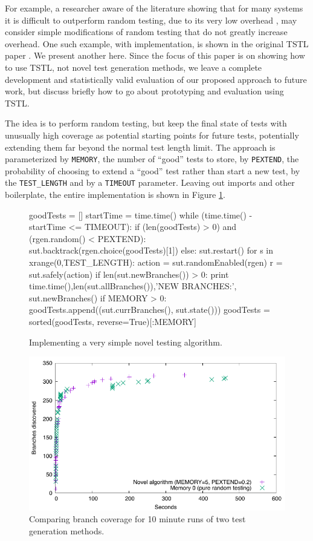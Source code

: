 For example, a researcher aware of the literature showing that for many systems it is difficult to outperform random testing, due to its very low overhead \cite{ISSRE12,ISSTA12}, may consider simple modifications of random testing that do not greatly increase overhead.  One such example, with implementation, is shown in the original TSTL paper \cite{NFM15}.  We present another here.  Since the focus of this paper is on showing how to use TSTL, not novel test generation methods, we leave a complete development and statistically valid evaluation of our proposed approach to future work, but discuss briefly how to go about prototyping and evaluation using TSTL.

The idea is to perform random testing, but keep the final state of tests with unusually high coverage as potential starting points for future tests, potentially extending them far beyond the normal test length limit.  The approach is parameterized by {\tt MEMORY}, the number of ``good'' tests to store, by {\tt PEXTEND}, the probability of choosing to extend a ``good'' test rather than start a new test, by the {\tt TEST\_LENGTH} and by a {\tt TIMEOUT} parameter.  Leaving out imports and other boilerplate, the entire implementation is shown in Figure \ref{fig:keepgood}.

\begin{figure}
{\scriptsize
\begin{code}
goodTests = []
startTime = time.time()
while (time.time() - startTime <= TIMEOUT):
   if (len(goodTests) > 0) and (rgen.random() < PEXTEND):
     sut.backtrack(rgen.choice(goodTests)[1])
   else:
     sut.restart()
   for s in xrange(0,TEST\_LENGTH): 
      action = sut.randomEnabled(rgen)
      r = sut.safely(action)
      if len(sut.newBranches()) > 0:
         print time.time(),len(sut.allBranches()),'NEW BRANCHES:', sut.newBranches()
   if MEMORY > 0:
      goodTests.append((sut.currBranches(), sut.state()))
      goodTests = sorted(goodTests, reverse=True)[:MEMORY]
\end{code}
}
\caption{Implementing a very simple novel testing algorithm.}
\label{fig:keepgood}
\end{figure}

\begin{figure}
\includegraphics[width=\columnwidth]{memory}
\caption{Comparing branch coverage for 10 minute runs of two test generation methods.}
\label{fig:compare}
\end{figure}

